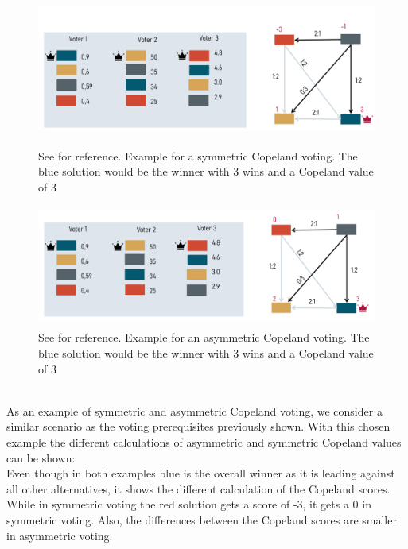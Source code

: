 \documentclass[german, a4paper, 11pt, oneside]{scrbook}
\begin{document}
\begin{figure}[h]
\centering
\includegraphics[height=4.4cm]{Copeland}
\caption{See \cite{Bhavnani.2022b} for reference. Example for a symmetric Copeland voting. The blue solution would be the winner with 3 wins and a Copeland value of 3}
\includegraphics[height=4cm]{Copeland_asym}
\caption{See \cite{Bhavnani.2022b} for reference. Example for an asymmetric Copeland voting. The blue solution would be the winner with 3 wins and a Copeland value of 3}
\end{figure}
\\
As an example of symmetric and asymmetric Copeland voting, we consider a similar scenario as the voting prerequisites previously shown. With this chosen example the different calculations of asymmetric and symmetric Copeland values can be shown:
\\Even though in both examples blue is the overall winner as it is leading against all other alternatives, it shows the different calculation of the Copeland scores. While in symmetric voting the red solution gets a score of -3, it gets a 0 in symmetric voting. Also, the differences between the Copeland scores are smaller in asymmetric voting.
\end{document}
